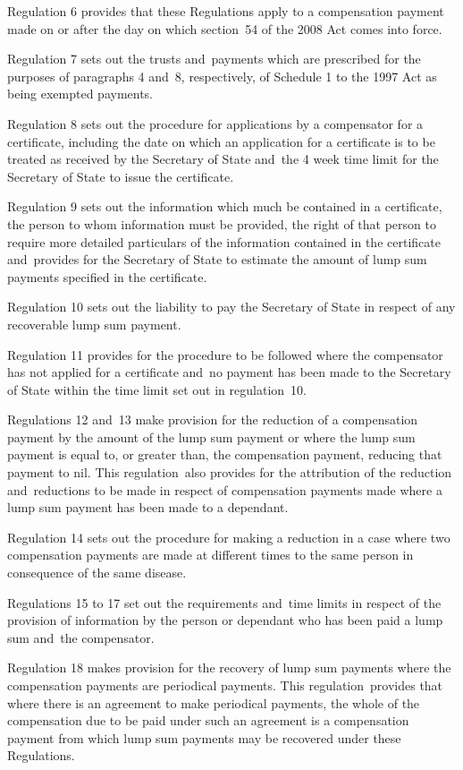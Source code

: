 \documentclass[12pt,a4paper]{article}
\begin{document}
Regulation 6 provides that these Regulations apply to a compensation payment made on or after the day on which section~54 of the 2008 Act comes into force.

Regulation 7 sets out the trusts and~payments which are prescribed for the purposes of paragraphs 4 and~8, respectively, of Schedule 1 to the 1997 Act as being exempted payments.

Regulation 8 sets out the procedure for applications by a compensator for a certificate, including the date on which an application for a certificate is to be treated as received by the Secretary of State and~the 4 week time limit for the Secretary of State to issue the certificate.

Regulation 9 sets out the information which much be contained in a certificate, the person to whom information must be provided, the right of that person to require more detailed particulars of the information contained in the certificate and~provides for the Secretary of State to estimate the amount of lump sum payments specified in the certificate.

Regulation 10 sets out the liability to pay the Secretary of State in respect of any recoverable lump sum payment.

Regulation 11 provides for the procedure to be followed where the compensator has not applied for a certificate and~no payment has been made to the Secretary of State within the time limit set out in regulation~10.

Regulations 12 and~13 make provision for the reduction of a compensation payment by the amount of the lump sum payment or where the lump sum payment is equal to, or greater than, the compensation payment, reducing that payment to nil. This regulation~also provides for the attribution of the reduction and~reductions to be made in respect of compensation payments made where a lump sum payment has been made to a dependant.

Regulation 14 sets out the procedure for making a reduction in a case where two compensation payments are made at different times to the same person in consequence of the same disease.

Regulations 15 to 17 set out the requirements and~time limits in respect of the provision of information by the person or dependant who has been paid a lump sum and~the compensator.

Regulation 18 makes provision for the recovery of lump sum payments where the compensation payments are periodical payments. This regulation~provides that where there is an agreement to make periodical payments, the whole of the compensation due to be paid under such an agreement is a compensation payment from which lump sum payments may be recovered under these Regulations.
\end{document}
